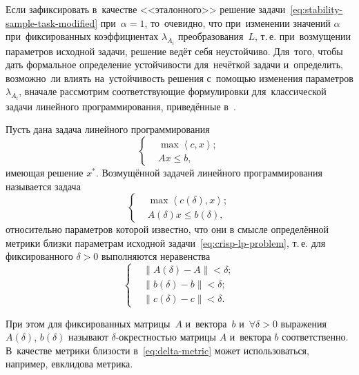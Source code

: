Если зафиксировать в~качестве <<эталонного>> решение задачи~\eqref{eq:stability-sample-task-modified} при~$\alpha=1$, то~очевидно, что при~изменении значений $\alpha$ при~фиксированных коэффициентах $\lambda_{A_i}$ преобразования~$L$, т.\,е. при~возмущении параметров исходной задачи, решение ведёт себя неустойчиво. Для~того, чтобы дать формальное определение устойчивости для~нечёткой задачи и~определить, возможно~ли влиять на~устойчивость решения с~помощью изменения параметров $\lambda_{A_i}$, вначале рассмотрим соответствующие формулировки для~классической задачи линейного программирования, приведённые в~\cite{Ashmanov}.

Пусть дана задача линейного программирования
\begin{equation}
\label{eq:crisp-lp-problem}
  \left\{ \begin{aligned}
    & \max \left\langle c,x \right\rangle; \\ 
    & Ax\leqslant b,
  \end{aligned} \right.
\end{equation}
имеющая решение $x^{*}$. Возмущённой задачей линейного программирования называется задача
\begin{equation}
\label{eq:crisp-lp-problem-unstable}
  \left\{ \begin{aligned}
    & \max \left\langle c\left(\delta \right),x \right\rangle; \\ 
    & A\left( \delta  \right)x\leqslant b\left(\delta \right),
  \end{aligned} \right.
\end{equation}
относительно параметров которой известно, что они в смысле определённой метрики близки параметрам исходной задачи~\eqref{eq:crisp-lp-problem}, т.\,е. для фиксированного $\delta>0$ выполняются неравенства
\begin{equation}
\label{eq:delta-metric}
  \left\{ \begin{aligned}
    & \left\| A\left( \delta  \right)-A \right\|<\delta; \\ 
    & \left\| b\left( \delta  \right)-b \right\|<\delta; \\ 
    & \left\| c\left( \delta  \right)-c \right\|<\delta.
  \end{aligned} \right.
\end{equation}

При этом для фиксированных матрицы~$A$ и~вектора~$b$ и~$\forall \delta >\text{0}$ выражения $A\left(\delta \right)$, $b\left(\delta \right)$ называют $\delta$-окрестностью матрицы $A$ и~вектора $b$ соответственно. В~качестве метрики близости в~\eqref{eq:delta-metric} может использоваться, например, евклидова метрика.

